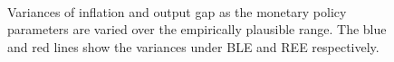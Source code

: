 

 \begin{figure}
\centering
       \mbox{\quad
      }
    \caption{Variances of inflation and output gap as the monetary policy parameters are varied over the empirically plausible range. The blue and red lines show the variances under BLE and REE respectively.}
     \label{optim_est}
 \end{figure}




